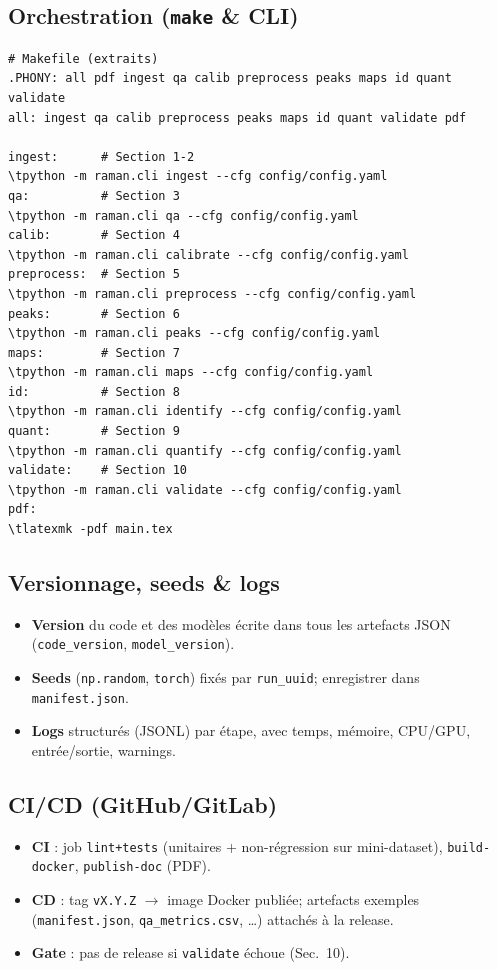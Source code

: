 \subsection{Orchestration (\texttt{make} \& CLI)}
\begin{lstlisting}[basicstyle=\ttfamily\small]
# Makefile (extraits)
.PHONY: all pdf ingest qa calib preprocess peaks maps id quant validate
all: ingest qa calib preprocess peaks maps id quant validate pdf

ingest:      # Section 1-2
\tpython -m raman.cli ingest --cfg config/config.yaml
qa:          # Section 3
\tpython -m raman.cli qa --cfg config/config.yaml
calib:       # Section 4
\tpython -m raman.cli calibrate --cfg config/config.yaml
preprocess:  # Section 5
\tpython -m raman.cli preprocess --cfg config/config.yaml
peaks:       # Section 6
\tpython -m raman.cli peaks --cfg config/config.yaml
maps:        # Section 7
\tpython -m raman.cli maps --cfg config/config.yaml
id:          # Section 8
\tpython -m raman.cli identify --cfg config/config.yaml
quant:       # Section 9
\tpython -m raman.cli quantify --cfg config/config.yaml
validate:    # Section 10
\tpython -m raman.cli validate --cfg config/config.yaml
pdf:
\tlatexmk -pdf main.tex
\end{lstlisting}

\subsection{Versionnage, seeds \& logs}
\begin{itemize}[nosep]
\item \textbf{Version} du code et des modèles écrite dans tous les artefacts JSON (\texttt{code\_version}, \texttt{model\_version}).
\item \textbf{Seeds} (\texttt{np.random}, \texttt{torch}) fixés par \texttt{run\_uuid}; enregistrer dans \texttt{manifest.json}.
\item \textbf{Logs} structurés (JSONL) par étape, avec temps, mémoire, CPU/GPU, entrée/sortie, warnings.
\end{itemize}

\subsection{CI/CD (GitHub/GitLab)}
\begin{itemize}[nosep]
\item \textbf{CI} : job \texttt{lint+tests} (unitaires + non-régression sur mini-dataset), \texttt{build-docker}, \texttt{publish-doc} (PDF).
\item \textbf{CD} : tag \texttt{vX.Y.Z} $\rightarrow$ image Docker publiée; artefacts exemples (\texttt{manifest.json}, \texttt{qa\_metrics.csv}, \ldots) attachés à la release.
\item \textbf{Gate} : pas de release si \texttt{validate} échoue (Sec.~10).
\end{itemize}

